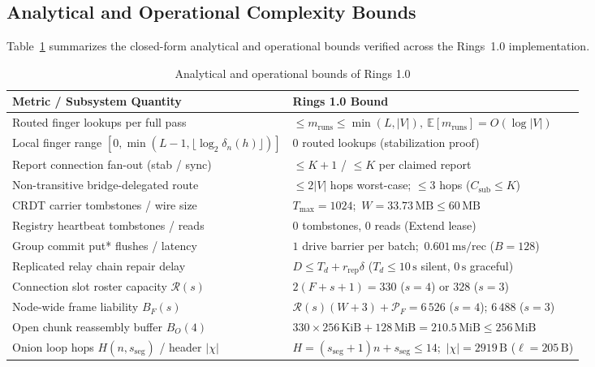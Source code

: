 \documentclass[journal]{IEEEtran}
\DeclareRobustCommand{\code}[1]{{\ttfamily\renewcommand{\_}{\textunderscore\allowbreak}#1}}
\begin{document}
\subsection{Analytical and Operational Complexity Bounds}

Table~\ref{tab:complexity-bounds} summarizes the closed-form analytical and operational bounds verified across the Rings~1.0 implementation.

\begin{table}[htbp]
\centering
\caption{Analytical and operational bounds of Rings 1.0}
\label{tab:complexity-bounds}
\footnotesize
\setlength{\tabcolsep}{3pt}
\begin{tabular}{@{}>{\raggedright\arraybackslash}p{}>{\raggedright\arraybackslash}p{}@{}}
\toprule
\textbf{Metric / Subsystem Quantity} & \textbf{Rings 1.0 Bound} \\
\midrule
Routed finger lookups per full pass & $\le m_{\mathrm{runs}}\le\min(L,|V|),\ \mathbb{E}[m_{\mathrm{runs}}]=O(\log |V|)$ \\
Local finger range $[0,\min(L{-}1,\lfloor\log_2\delta_n(h)\rfloor)]$ & $0$ routed lookups (stabilization proof) \\
Report connection fan-out (stab / sync) & $\le K+1$ / $\le K$ per claimed report \\
Non-transitive bridge-delegated route & $\le 2|V|$ hops worst-case; $\le 3$ hops ($C_{\text{sub}}\le K$) \\
CRDT carrier tombstones / wire size & $T_{\max}=1024$;\ $W=33.73\,\text{MB}\le 60\,\text{MB}$ \\
Registry heartbeat tombstones / reads & $0$ tombstones, $0$ reads (\code{Extend} lease) \\
Group commit \code{put*} flushes / latency & $1$ drive barrier per batch;\ $0.601\,\text{ms/rec}$ ($B{=}128$) \\
Replicated relay chain repair delay & $D\le T_d+r_{\mathrm{rep}}\delta$ ($T_d\le 10\,\text{s}$ silent, $0\,\text{s}$ graceful) \\
Connection slot roster capacity $\mathcal{R}(s)$ & $2(F+s+1)=330$ ($s=4$) or $328$ ($s=3$) \\
Node-wide frame liability $B_F(s)$ & $\mathcal{R}(s)(W+3)+\mathcal{P}_F=6\,526$ ($s=4$); $6\,488$ ($s=3$) \\
Open chunk reassembly buffer $B_O(4)$ & $330\times 256\,\text{KiB}+128\,\text{MiB}=210.5\,\text{MiB}\le 256\,\text{MiB}$ \\
Onion loop hops $H(n,s_{\mathrm{seg}})$ / header $|\chi|$ & $H=(s_{\mathrm{seg}}+1)n+s_{\mathrm{seg}}\le 14$;\ $|\chi|=2919\,\text{B}$ ($\ell=205\,\text{B}$) \\

\end{tabular}
\end{table}
\end{document}
